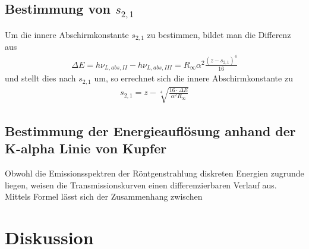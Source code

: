 \subsection{Bestimmung von $s_{2,1}$}
Um die innere Abschirmkonstante $s_{2,1}$ zu bestimmen, bildet man die Differenz aus %
\begin{align}
\Delta E = h\nu_{L,abs,II}-h\nu_{L,abs,III} = R_\infty\alpha^2\frac{(z-s_{2,1})^4}{16}
\end{align}
und stellt dies nach $s_{2,1}$ um, so errechnet sich die innere Abschirmkonstante zu
\begin{align}
s_{2,1} = z-\sqrt[4]{\frac{16\cdot\Delta E}{\alpha^2 R_\infty}}
\end{align}

\subsection{Bestimmung der Energieauflösung anhand der K-alpha Linie von Kupfer}
Obwohl die Emissionsspektren der Röntgenstrahlung diskreten Energien zugrunde liegen, weisen die Transmissionskurven einen differenzierbaren Verlauf aus. Mittels Formel %
 lässt sich der Zusammenhang zwischen 
\section{Diskussion}





